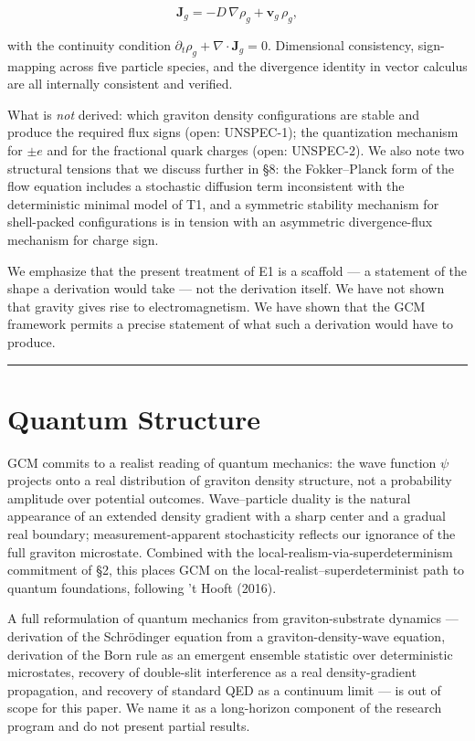 \documentclass[12pt]{article}
\theoremstyle{definition}
\theoremstyle{remark}
\begin{document}
\[\mathbf{J}_g = -D\,\nabla\rho_g + \mathbf{v}_g\,\rho_g,\]

with the continuity condition
\(\partial_t \rho_g + \nabla \cdot \mathbf{J}_g = 0\). Dimensional
consistency, sign-mapping across five particle species, and the
divergence identity in vector calculus are all internally consistent and
verified.

What is \emph{not} derived: which graviton density configurations are
stable and produce the required flux signs (open: UNSPEC-1); the
quantization mechanism for \(\pm e\) and for the fractional quark
charges (open: UNSPEC-2). We also note two structural tensions that we
discuss further in §8: the Fokker--Planck form of the flow equation
includes a stochastic diffusion term inconsistent with the deterministic
minimal model of T1, and a symmetric stability mechanism for
shell-packed configurations is in tension with an asymmetric
divergence-flux mechanism for charge sign.

We emphasize that the present treatment of E1 is a scaffold --- a
statement of the shape a derivation would take --- not the derivation
itself. We have not shown that gravity gives rise to electromagnetism.
We have shown that the GCM framework permits a precise statement of what
such a derivation would have to produce.

\begin{center}\rule{0.5\linewidth}{0.5pt}\end{center}

\section{Quantum Structure}\label{sec:quantum}

GCM commits to a realist reading of quantum mechanics: the wave function
\(\psi\) projects onto a real distribution of graviton density
structure, not a probability amplitude over potential outcomes.
Wave--particle duality is the natural appearance of an extended density
gradient with a sharp center and a gradual real boundary;
measurement-apparent stochasticity reflects our ignorance of the full
graviton microstate. Combined with the
local-realism-via-superdeterminism commitment of §2, this places GCM on
the local-realist--superdeterminist path to quantum foundations,
following 't Hooft (2016).

A full reformulation of quantum mechanics from graviton-substrate
dynamics --- derivation of the Schrödinger equation from a
graviton-density-wave equation, derivation of the Born rule as an
emergent ensemble statistic over deterministic microstates, recovery of
double-slit interference as a real density-gradient propagation, and
recovery of standard QED as a continuum limit --- is out of scope for
this paper. We name it as a long-horizon component of the research
program and do not present partial results.
\end{document}
